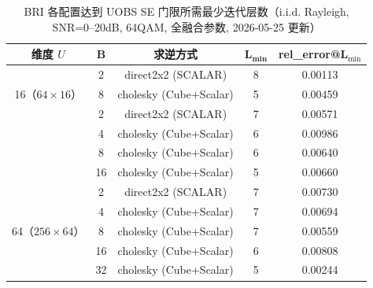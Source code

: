     \begin{table}[H]
        \centering
        \caption{BRI 各配置达到 UOBS SE 门限所需最少迭代层数（i.i.d. Rayleigh,
        SNR=0--20dB, 64QAM, 全融合参数, 2026-05-25 更新）}
        \label{tab:bri-se-layers}
        \begin{tabular}{c c c c c}
            \toprule \textbf{维度 $U$}                    & $\bm{B}$ & \textbf{求逆方式}          & $\bm{L_{\min}}$ & \textbf{rel\_error@L$_{\min}$} \\
            \midrule \multirow{3}{*}{16（$64\times16$）}  & 2        & direct2x2 (SCALAR)     & 8               & 0.00113                        \\
                                                        & 8        & cholesky (Cube+Scalar) & 5               & 0.00459                        \\
            \midrule \multirow{4}{*}{32（$128\times32$）} & 2        & direct2x2 (SCALAR)     & 7               & 0.00571                        \\
                                                        & 4        & cholesky (Cube+Scalar) & 6               & 0.00986                        \\
                                                        & 8        & cholesky (Cube+Scalar) & 6               & 0.00640                        \\
                                                        & 16       & cholesky (Cube+Scalar) & 5               & 0.00660                        \\
            \midrule \multirow{5}{*}{64（$256\times64$）} & 2        & direct2x2 (SCALAR)     & 7               & 0.00730                        \\
                                                        & 4        & cholesky (Cube+Scalar) & 7               & 0.00694                        \\
                                                        & 8        & cholesky (Cube+Scalar) & 7               & 0.00559                        \\
                                                        & 16       & cholesky (Cube+Scalar) & 6               & 0.00808                        \\
                                                        & 32       & cholesky (Cube+Scalar) & 5               & 0.00244                        \\
            \bottomrule
        \end{tabular}
    \end{table}

